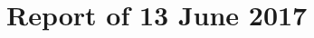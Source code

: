 \documentclass[aspectratio=169, xcolor=table]{beamer}
\begin{document}

\part{Report of 13 June 2017}



\end{document}

